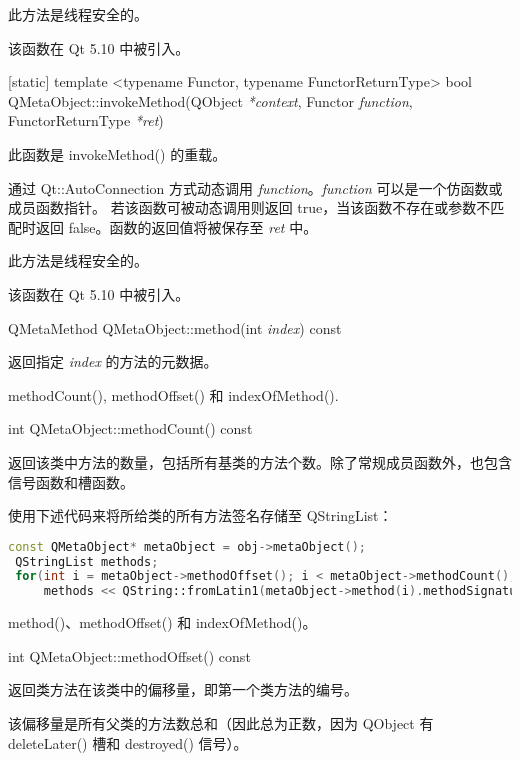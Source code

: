 \begin{notice}
此方法是线程安全的。
\end{notice}

该函数在 Qt 5.10 中被引入。

[static] template <typename Functor, typename FunctorReturnType> bool QMetaObject::invokeMethod(QObject \emph{*context}, Functor \emph{function}, FunctorReturnType \emph{*ret})

此函数是 invokeMethod() 的重载。

通过 Qt::AutoConnection 方式动态调用 \emph{function}。\emph{function} 可以是一个仿函数或成员函数指针。
若该函数可被动态调用则返回 true，当该函数不存在或参数不匹配时返回 false。函数的返回值将被保存至 \emph{ret} 中。


\begin{notice}
此方法是线程安全的。
\end{notice}


该函数在 Qt 5.10 中被引入。

QMetaMethod QMetaObject::method(int \emph{index}) const

返回指定 \emph{index} 的方法的元数据。

\begin{seeAlso}
methodCount(), methodOffset() 和 indexOfMethod().
\end{seeAlso}

int QMetaObject::methodCount() const

返回该类中方法的数量，包括所有基类的方法个数。除了常规成员函数外，也包含信号函数和槽函数。

使用下述代码来将所给类的所有方法签名存储至 QStringList：

\begin{lstlisting}[language=C++]
 const QMetaObject* metaObject = obj->metaObject();
 QStringList methods;
 for(int i = metaObject->methodOffset(); i < metaObject->methodCount(); ++i)
     methods << QString::fromLatin1(metaObject->method(i).methodSignature());
\end{lstlisting}

\begin{seeAlso}
method()、methodOffset() 和 indexOfMethod()。
\end{seeAlso}

int QMetaObject::methodOffset() const

返回类方法在该类中的偏移量，即第一个类方法的编号。

该偏移量是所有父类的方法数总和（因此总为正数，因为 QObject 有 deleteLater() 槽和 destroyed() 信号）。

